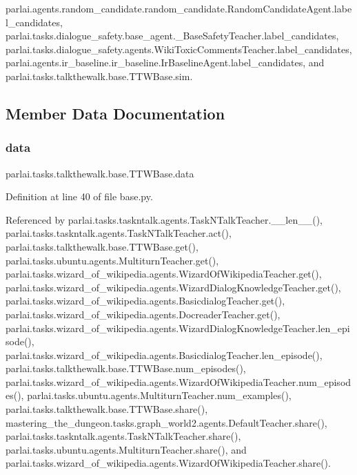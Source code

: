 parlai.\+agents.\+random\+\_\+candidate.\+random\+\_\+candidate.\+Random\+Candidate\+Agent.\+label\+\_\+candidates, parlai.\+tasks.\+dialogue\+\_\+safety.\+base\+\_\+agent.\+\_\+\+Base\+Safety\+Teacher.\+label\+\_\+candidates, parlai.\+tasks.\+dialogue\+\_\+safety.\+agents.\+Wiki\+Toxic\+Comments\+Teacher.\+label\+\_\+candidates, parlai.\+agents.\+ir\+\_\+baseline.\+ir\+\_\+baseline.\+Ir\+Baseline\+Agent.\+label\+\_\+candidates, and parlai.\+tasks.\+talkthewalk.\+base.\+T\+T\+W\+Base.\+sim.



\subsection{Member Data Documentation}
\mbox{\label{classparlai_1_1tasks_1_1talkthewalk_1_1base_1_1TTWBase_a3080a626f294ef819e26aedb322ee99a}} 
\subsubsection{\texorpdfstring{data}{data}}
{\footnotesize\ttfamily parlai.\+tasks.\+talkthewalk.\+base.\+T\+T\+W\+Base.\+data}



Definition at line 40 of file base.\+py.



Referenced by parlai.\+tasks.\+taskntalk.\+agents.\+Task\+N\+Talk\+Teacher.\+\_\+\+\_\+len\+\_\+\+\_\+(), parlai.\+tasks.\+taskntalk.\+agents.\+Task\+N\+Talk\+Teacher.\+act(), parlai.\+tasks.\+talkthewalk.\+base.\+T\+T\+W\+Base.\+get(), parlai.\+tasks.\+ubuntu.\+agents.\+Multiturn\+Teacher.\+get(), parlai.\+tasks.\+wizard\+\_\+of\+\_\+wikipedia.\+agents.\+Wizard\+Of\+Wikipedia\+Teacher.\+get(), parlai.\+tasks.\+wizard\+\_\+of\+\_\+wikipedia.\+agents.\+Wizard\+Dialog\+Knowledge\+Teacher.\+get(), parlai.\+tasks.\+wizard\+\_\+of\+\_\+wikipedia.\+agents.\+Basicdialog\+Teacher.\+get(), parlai.\+tasks.\+wizard\+\_\+of\+\_\+wikipedia.\+agents.\+Docreader\+Teacher.\+get(), parlai.\+tasks.\+wizard\+\_\+of\+\_\+wikipedia.\+agents.\+Wizard\+Dialog\+Knowledge\+Teacher.\+len\+\_\+episode(), parlai.\+tasks.\+wizard\+\_\+of\+\_\+wikipedia.\+agents.\+Basicdialog\+Teacher.\+len\+\_\+episode(), parlai.\+tasks.\+talkthewalk.\+base.\+T\+T\+W\+Base.\+num\+\_\+episodes(), parlai.\+tasks.\+wizard\+\_\+of\+\_\+wikipedia.\+agents.\+Wizard\+Of\+Wikipedia\+Teacher.\+num\+\_\+episodes(), parlai.\+tasks.\+ubuntu.\+agents.\+Multiturn\+Teacher.\+num\+\_\+examples(), parlai.\+tasks.\+talkthewalk.\+base.\+T\+T\+W\+Base.\+share(), mastering\+\_\+the\+\_\+dungeon.\+tasks.\+graph\+\_\+world2.\+agents.\+Default\+Teacher.\+share(), parlai.\+tasks.\+taskntalk.\+agents.\+Task\+N\+Talk\+Teacher.\+share(), parlai.\+tasks.\+ubuntu.\+agents.\+Multiturn\+Teacher.\+share(), and parlai.\+tasks.\+wizard\+\_\+of\+\_\+wikipedia.\+agents.\+Wizard\+Of\+Wikipedia\+Teacher.\+share().

